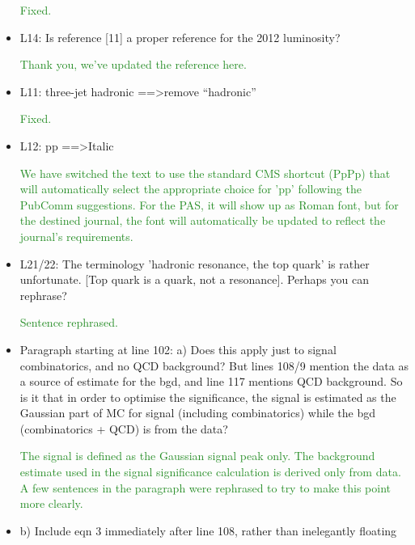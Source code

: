 \documentclass[paper=a4, fontsize=11pt]{scrartcl}
\begin{document}
\begin{itemize}
\textcolor{ForestGreen}{Fixed.}\\

\item L14: 
Is reference [11] a proper reference for the 2012 luminosity? 

\textcolor{ForestGreen}{Thank you, we've updated the reference here.}\\

\item L11: 
three-jet hadronic ==\textgreater remove “hadronic” 

\textcolor{ForestGreen}{Fixed.}\\

\item L12: 
pp ==\textgreater Italic 

\textcolor{ForestGreen}{We have switched the text to use the standard CMS shortcut (PpPp)
that will automatically select the appropriate choice for 'pp' following the PubComm
suggestions. For the PAS, it will show up as Roman font, but for the destined journal,
the font will automatically be updated to reflect the journal's requirements.}\\

\item L21/22: 
The terminology 'hadronic resonance, the top quark' is rather unfortunate. 
[Top quark is a quark, not a resonance]. Perhaps you can rephrase? 

\textcolor{ForestGreen}{Sentence rephrased.}\\

\item Paragraph starting at line 102: 
a) Does this apply just to signal combinatorics, and no QCD background? But 
lines 108/9 mention the data as a source of estimate for the bgd, and line 
117 mentions QCD background. So is it that in order to optimise the 
significance, the signal is estimated as the Gaussian part of MC for signal 
(including combinatorics) while the bgd (combinatorics + QCD) is from the 
data?

\textcolor{ForestGreen}{The signal is defined as the Gaussian signal peak only.
The background estimate used in the signal significance calculation is
derived only from data. A few sentences in the paragraph were rephrased
to try to make this point more clearly.}\\

\item b) Include eqn 3 immediately after line 108, rather than inelegantly floating 


\end{itemize}
\end{document}
